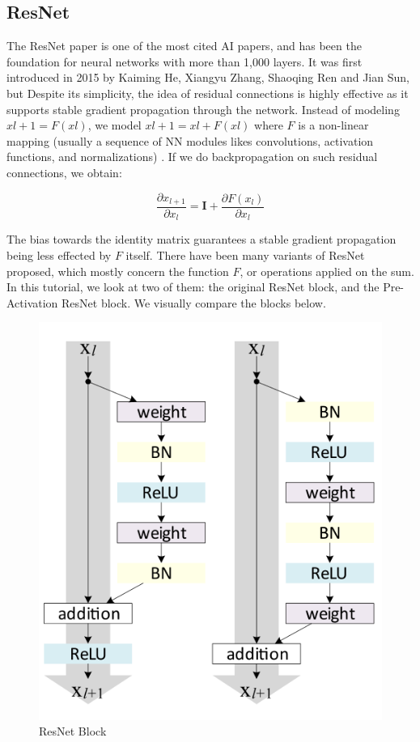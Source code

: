 \documentclass[peerreview]{IEEEtran}
\begin{document}
\subsection{ResNet}
The ResNet paper is one of the most cited AI papers, and has been the foundation for neural networks with more than 1,000 layers. It was first introduced in 2015 by Kaiming He, Xiangyu Zhang, Shaoqing Ren and Jian Sun, but Despite its simplicity, the idea of residual connections is highly effective as it supports stable gradient propagation through the network. Instead of modeling $xl+1=F(xl)$, we model $xl+1=xl+F(xl)$ where $F$ is a non-linear mapping (usually a sequence of NN modules likes convolutions, activation functions, and normalizations) \cite{he2016deep}. If we do backpropagation on such residual connections, we obtain:

$$\frac{\partial x_{l+1}}{\partial x_{l}} = \mathbf{I} + \frac{\partial F(x_{l})}{\partial x_{l}}$$

The bias towards the identity matrix guarantees a stable gradient propagation being less effected by $F$ itself. There have been many variants of ResNet proposed, which mostly concern the function $F$, or operations applied on the sum. In this tutorial, we look at two of them: the original ResNet block, and the Pre-Activation ResNet block. We visually compare the blocks below.

\begin{figure}[!ht]
    \centering
    \includegraphics[width=0.8\columnwidth]{resnet_block}
    \caption{ResNet Block}
    \label{fig:resnet_block}
\end{figure}
\end{document}
